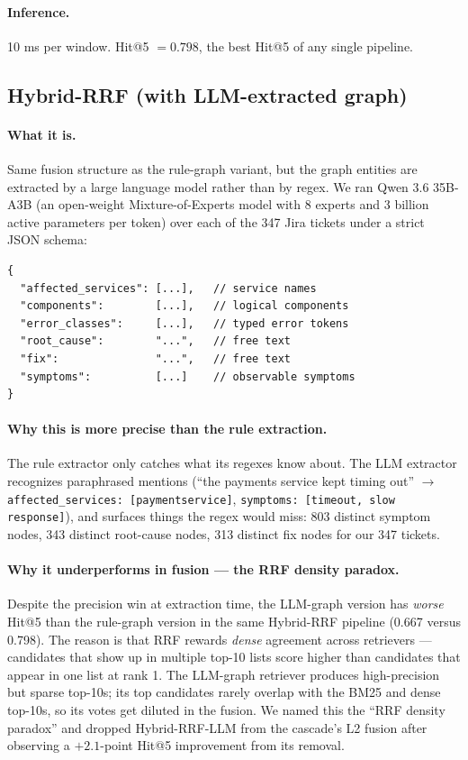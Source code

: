 \paragraph{Inference.} 10 ms per window. Hit@5 $= 0.798$, the best Hit@5 of any single pipeline.

\subsection{Hybrid-RRF (with LLM-extracted graph)}

\paragraph{What it is.} Same fusion structure as the rule-graph variant, but the graph entities are extracted by a large language model rather than by regex. We ran Qwen 3.6 35B-A3B (an open-weight Mixture-of-Experts model with 8 experts and 3 billion active parameters per token) over each of the 347 Jira tickets under a strict JSON schema:

\begin{lstlisting}[basicstyle=\ttfamily\scriptsize]
{
  "affected_services": [...],   // service names
  "components":        [...],   // logical components
  "error_classes":     [...],   // typed error tokens
  "root_cause":        "...",   // free text
  "fix":               "...",   // free text
  "symptoms":          [...]    // observable symptoms
}
\end{lstlisting}

\paragraph{Why this is more precise than the rule extraction.} The rule extractor only catches what its regexes know about. The LLM extractor recognizes paraphrased mentions (``the payments service kept timing out'' $\rightarrow$ \texttt{affected\_services: [paymentservice]}, \texttt{symptoms: [timeout, slow response]}), and surfaces things the regex would miss: 803 distinct symptom nodes, 343 distinct root-cause nodes, 313 distinct fix nodes for our 347 tickets.

\paragraph{Why it underperforms in fusion --- the RRF density paradox.} Despite the precision win at extraction time, the LLM-graph version has \emph{worse} Hit@5 than the rule-graph version in the same Hybrid-RRF pipeline (0.667 versus 0.798). The reason is that RRF rewards \emph{dense} agreement across retrievers --- candidates that show up in multiple top-10 lists score higher than candidates that appear in one list at rank 1. The LLM-graph retriever produces high-precision but sparse top-10s; its top candidates rarely overlap with the BM25 and dense top-10s, so its votes get diluted in the fusion. We named this the ``RRF density paradox'' and dropped Hybrid-RRF-LLM from the cascade's L2 fusion after observing a $+2.1$-point Hit@5 improvement from its removal.

